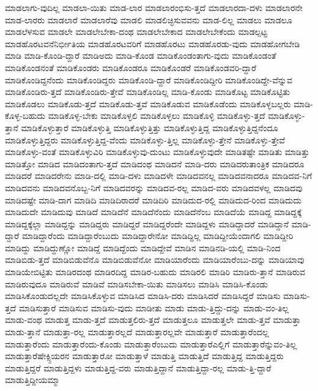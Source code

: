 {ಮಾಡಲಾಗು-ವುದಿಲ್ಲ
ಮಾಡಲಾ-ಯಿತು
ಮಾಡ-ಲಾರ
ಮಾಡಲಾರಂಭಿಸು-ತ್ತದೆ
ಮಾಡಲಾರದಾ-ದಳು
ಮಾಡಲಾರನೇ
ಮಾಡ-ಲಾರರು
ಮಾಡಲಾರೆ
ಮಾಡಲಾರೆವು
ಮಾಡಲಿ
ಮಾಡಲಿಚ್ಛಿಸುವವನು
ಮಾಡ-ಲಿಲ್ಲ
ಮಾಡಲು
ಮಾಡಲೂ
ಮಾಡಲೆಳಸುವ
ಮಾಡಲೇ
ಮಾಡಲೇಬೇಕಾ-ದಂಥ
ಮಾಡಲೇಬೇಕಾದ
ಮಾಡಲೇಬೇಕೆಂದು
ಮಾಡಲ್ಪಟ್ಟ
ಮಾಡಹೊರಟವನೆನಿರ್ಭೀತಿಯ
ಮಾಡಹೊರಟವರಿಗೆ
ಮಾಡಹೊರಟು
ಮಾಡಹೊರಡು-ವುದು
ಮಾಡಹೋಗಬೇಡಿ
ಮಾಡಿ
ಮಾಡಿ-ಕೊಂಡಿ-ದ್ದಾರೆ
ಮಾಡಿಅದು
ಮಾಡಿ-ಕೊಂಡ
ಮಾಡಿಕೊಂಡಂತಾಗು-ವುದು
ಮಾಡಿಕೊಂಡಂತೆ
ಮಾಡಿಕೊಂಡನಂತೆ
ಮಾಡಿಕೊಂಡರು
ಮಾಡಿಕೊಂಡರೂ
ಮಾಡಿಕೊಂಡರೆ
ಮಾಡಿಕೊಂಡವರಿ-ದ್ದಾರೆ
ಮಾಡಿಕೊಂಡಿದ್ದನೆಂದು
ಮಾಡಿಕೊಂಡಿದ್ದರು
ಮಾಡಿಕೊಂಡಿ-ದ್ದಾರೆ
ಮಾಡಿಕೊಂಡಿದ್ದೀರಿ
ಮಾಡಿಕೊಂಡಿದ್ದೇ-ವೆನ್ನುವ
ಮಾಡಿಕೊಂಡಿರು-ತ್ತದೆ
ಮಾಡಿಕೊಂಡಿರು-ತ್ತೇವೆ
ಮಾಡಿಕೊಂಡಿಲ್ಲ
ಮಾಡಿ-ಕೊಂಡು
ಮಾಡಿಕೊಟ್ಟ
ಮಾಡಿಕೊಟ್ಟಿತು
ಮಾಡಿಕೊಡಲು
ಮಾಡಿಕೊಡು-ತ್ತದೆ
ಮಾಡಿಕೊಡು-ತ್ತವೆ
ಮಾಡಿಕೊಡುವ
ಮಾಡಿಕೊಡೆಂದು
ಮಾಡಿಕೊಳ್ಳಬಲ್ಲರು
ಮಾಡಿ-ಕೊಳ್ಳ-ಬಹುದು
ಮಾಡಿಕೊಳ್ಳ-ಬೇಕು
ಮಾಡಿಕೊಳ್ಳಲಿ
ಮಾಡಿಕೊಳ್ಳಲು
ಮಾಡಿಕೊಳ್ಳಿ
ಮಾಡಿಕೊಳ್ಳು-ತ್ತದೆ
ಮಾಡಿಕೊಳ್ಳು-ತ್ತಾನೆ
ಮಾಡಿಕೊಳ್ಳುತ್ತಾರೆ
ಮಾಡಿಕೊಳ್ಳುತ್ತಿ
ಮಾಡಿಕೊಳ್ಳುತ್ತಿತ್ತು
ಮಾಡಿಕೊಳ್ಳುತ್ತಿದ್ದ
ಮಾಡಿಕೊಳ್ಳುತ್ತಿದ್ದನೆಂದೂ
ಮಾಡಿಕೊಳ್ಳುತ್ತಿದ್ದರು
ಮಾಡಿಕೊಳ್ಳುತ್ತಿದ್ದ-ವೆಂದು
ಮಾಡಿಕೊಳ್ಳು-ತ್ತಿಲ್ಲ
ಮಾಡಿಕೊಳ್ಳು-ತ್ತೇನೆ
ಮಾಡಿಕೊಳ್ಳು-ತ್ತೇವೆ
ಮಾಡಿಕೊಳ್ಳು-ವಂತೆ
ಮಾಡಿಕೊಳ್ಳುವಿರಿ
ಮಾಡಿಕೊಳ್ಳುವು-ದುಂಟು
ಮಾಡಿಕೊಳ್ಳುವುದೇ
ಮಾಡಿತಷ್ಟೇ
ಮಾಡಿತು
ಮಾಡಿತ್ತು
ಮಾಡಿತ್ತೋ
ಮಾಡಿದ
ಮಾಡಿದಂತಾಗು-ತ್ತದೆ
ಮಾಡಿದಂಥ
ಮಾಡಿದನೆ
ಮಾಡಿ-ದರು
ಮಾಡಿದರುತಾಂತ್ರಿಕ
ಮಾಡಿದರೂ
ಮಾಡಿದರೆ
ಮಾಡಿದರೇನು
ಮಾಡಿ-ದಲ್ಲಿ
ಮಾಡಿ-ದಳು
ಮಾಡಿದಳೇ
ಮಾಡಿದವನಲ್ಲ
ಮಾಡಿದವನಾದರೂ
ಮಾಡಿದವ-ನಿಗೆ
ಮಾಡಿದವನು
ಮಾಡಿದವನೊಬ್ಬ-ನಿಗೆ
ಮಾಡಿದವರನ್ನು
ಮಾಡಿದವ-ರಲ್ಲ
ಮಾಡಿದ-ವರು
ಮಾಡಿದವಳಲ್ಲ
ಮಾಡಿದವು
ಮಾಡಿದಷ್ಟೇ
ಮಾಡಿ-ದಾಗ
ಮಾಡಿದಿ
ಮಾಡಿದಿರಾದರೆ
ಮಾಡಿದಿರಿ
ಮಾಡಿದುದ-ರಲ್ಲಿ
ಮಾಡಿದುದ-ರಿಂದ
ಮಾಡಿದುದು
ಮಾಡಿದುದೇ
ಮಾಡಿದುವು
ಮಾಡಿದೆ
ಮಾಡಿದೆನೆ
ಮಾಡಿದೆನೆಂದು
ಮಾಡಿದೆನೆಂಬ
ಮಾಡಿದೆಯೆ
ಮಾಡಿದ್ದ
ಮಾಡಿದ್ದಕ್ಕೆ
ಮಾಡಿದ್ದಕ್ಕೆಲ್ಲಾ
ಮಾಡಿದ್ದನ್ನು
ಮಾಡಿದ್ದರು
ಮಾಡಿದ್ದರೆ
ಮಾಡಿದ್ದರೆಂದೇ
ಮಾಡಿದ್ದಳು
ಮಾಡಿದ್ದಾದರೆ
ಮಾಡಿದ್ದಾನೆ
ಮಾಡಿ-ದ್ದಾರೆ
ಮಾಡಿದ್ದಾರೆಂದು
ಮಾಡಿದ್ದಾರೆಂಬುದು
ಮಾಡಿದ್ದಾರೇನೋ
ಮಾಡಿದ್ದಿಲ್ಲ
ಮಾಡಿದ್ದೀಯೆಂದಾಗಲಿ
ಮಾಡಿದ್ದೀರಿ
ಮಾಡಿದ್ದು
ಮಾಡಿದ್ದುಣ್ಣೋ
ಮಾಡಿದ್ದೆ
ಮಾಡಿದ್ದೆಂದು
ಮಾಡಿದ್ದೇವೆ
ಮಾಡಿನ
ಮಾಡಿನಡಿ-ಯಲ್ಲಿ
ಮಾಡಿ-ನಿಂದ
ಮಾಡಿಬಿಡು-ತ್ತದೆ
ಮಾಡಿಬಿಡುವೆನೊ
ಮಾಡಿಬಿಡುವೆನೋ
ಮಾಡಿಯಾರೆಂದು
ಮಾಡಿಯಾರೆಂಬು-ದನ್ನು
ಮಾಡಿಯಾವು
ಮಾಡಿಯೇಬಿಟ್ಟಿತು
ಮಾಡಿರದಂಥ
ಮಾಡಿರದಿದ್ದ
ಮಾಡಿರ-ಬಹುದು
ಮಾಡಿರಲಿ
ಮಾಡಿರಿ
ಮಾಡಿರು-ತ್ತಾನೆ
ಮಾಡಿರುವ
ಮಾಡಿರುವುದೂ
ಮಾಡಿರುವೆ
ಮಾಡಿವೆ
ಮಾಡಿಸಬೇಕಾ-ಯಿತು
ಮಾಡಿಸಲು
ಮಾಡಿಸಿ
ಮಾಡಿಸಿ-ಕೊಂಡು
ಮಾಡಿಸಿಕೊಂಡುದಲ್ಲದೇ
ಮಾಡಿಸಿಕೊಳ್ಳುವ
ಮಾಡಿಸಿದ
ಮಾಡಿಸಿ-ದರು
ಮಾಡಿಸಿದರೆ
ಮಾಡಿಸಿದ್ದರೆ
ಮಾಡಿಸು
ಮಾಡಿಸು-ತ್ತದೆ
ಮಾಡಿಸುತ್ತಾರೆ
ಮಾಡಿಸುವ
ಮಾಡಿಸು-ವುದು
ಮಾಡೀತು
ಮಾಡು
ಮಾಡು-ತ್ತಿದ್ದು-ದನ್ನು
ಮಾಡು-ವಂ-ತಿಲ್ಲ
ಮಾಡು-ವಂಥ
ಮಾಡುತ್ತ
ಮಾಡು-ತ್ತದೆ
ಮಾಡುತ್ತಲಿರು-ತ್ತದೆ
ಮಾಡುತ್ತಲೂ
ಮಾಡುತ್ತಲೇ
ಮಾಡು-ತ್ತವೆ
ಮಾಡುತ್ತಾ
ಮಾಡು-ತ್ತಾನೆ
ಮಾಡುತ್ತಾ-ರಲ್ಲ
ಮಾಡುತ್ತಾರಲ್ಲದೆ
ಮಾಡುತ್ತಾರಲ್ಲವೇ
ಮಾಡುತ್ತಾರೆ
ಮಾಡುತ್ತಾರೆಂದಲ್ಲ
ಮಾಡುತ್ತಾರೆಂದು
ಮಾಡುತ್ತಾರೆಂದು-ಕೊಂಡು
ಮಾಡುತ್ತಾರೆಂಬುದು
ಮಾಡುತ್ತಾರೆಎಲ್ಲಿಗೆ
ಮಾಡುತ್ತಾರೆನ್ನುವಂ-ತಿಲ್ಲ
ಮಾಡುತ್ತಾರೆಷೇಕ್ಸ್ಪಿಯರನ
ಮಾಡುತ್ತಾರೋ
ಮಾಡುತ್ತಾಳೆ
ಮಾಡುತ್ತಿ
ಮಾಡುತ್ತಿದೆ
ಮಾಡುತ್ತಿದ್ದ
ಮಾಡುತ್ತಿದ್ದರು
ಮಾಡುತ್ತಿದ್ದರೆ
ಮಾಡುತ್ತಿದ್ದಳು
ಮಾಡುತ್ತಿದ್ದ-ವರು
ಮಾಡುತ್ತಿದ್ದಾನೆ
ಮಾಡುತ್ತಿದ್ದಾ-ರಲ್ಲ
ಮಾಡು-ತ್ತಿ-ದ್ದಾರೆ
ಮಾಡುತ್ತಿದ್ದೀಯಮ್ಮಾ
}
